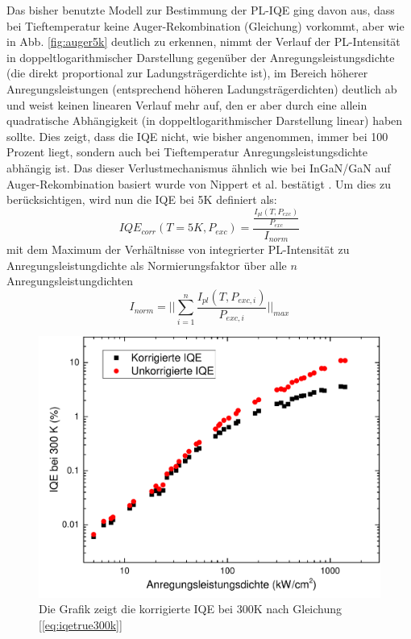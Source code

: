 \vspace{0.1cm}
\noindent
Das bisher benutzte Modell zur Bestimmung der PL-IQE ging davon aus, dass bei Tieftemperatur keine Auger-Rekombination (Gleichung) vorkommt, aber wie in Abb. \ref{fig:auger5k} deutlich zu erkennen, nimmt der Verlauf der PL-Intensität in doppeltlogarithmischer Darstellung gegenüber der Anregungsleistungsdichte (die direkt proportional zur Ladungsträgerdichte ist), im Bereich höherer Anregungsleistungen (entsprechend höheren Ladungsträgerdichten) deutlich ab und weist keinen linearen Verlauf mehr auf, den er aber durch eine allein quadratische Abhängigkeit (in doppeltlogarithmischer Darstellung linear) haben sollte. Dies zeigt, dass die IQE nicht, wie bisher angenommen, immer bei 100 Prozent liegt, sondern auch bei Tieftemperatur Anregungsleistungsdichte abhängig ist. Das dieser Verlustmechanismus ähnlich wie bei InGaN/GaN auf Auger-Rekombination basiert wurde von Nippert et al. bestätigt \cite{doi:10.1063/1.4965298}. 
Um dies zu berücksichtigen, wird nun die IQE bei 5K definiert als:
%
\begin{equation}
    IQE_{corr}(T = 5K, P_{exc}) = \frac{ \frac{I_{pl}(T,P_{exc}) }{P_{exc} } } { I_{norm}}
    \label{eq:iqetrue5k}
\end{equation}
%
mit dem Maximum der Verhältnisse von integrierter PL-Intensität zu Anregungsleistungdichte als  Normierungsfaktor über alle $n$ Anregungsleistungdichten
\begin{equation}
    I_{norm} = \lvert \lvert \sum_{i=1}^{n} \frac{I_{pl}(T,P_{exc,i})}{P_{exc,i}} \lvert \lvert_{max}
    \label{eq:iplnorm}
\end{equation}
%
\begin{figure}[htb]
\centering
    \begin{minipage}[t]{0.49\linewidth}
        \includegraphics[width=\linewidth]{Bilder/korrigierteIQE300K.pdf}
        \caption{Die Grafik zeigt die korrigierte IQE bei 300K nach Gleichung [\ref{eq:iqetrue300k}] }
        \label{fig:trueiqe300k}
    \end{minipage}
\end{figure}
